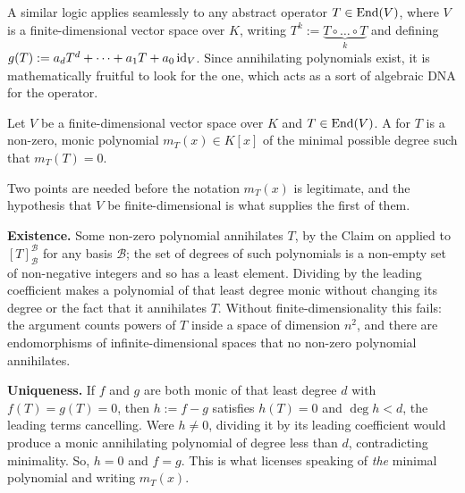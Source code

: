 A similar logic applies seamlessly to any abstract operator $T \in \operatorname{End}(V)$, where $V$ is a finite-dimensional vector space over $K$, writing $T^k := \underbrace{T \circ \dots \circ T}_{k}$ and defining $g(T) := a_d T^d + \dots + a_1 T + a_0 \operatorname{id}_V$. Since annihilating polynomials exist, it is mathematically fruitful to look for the  one, which acts as a sort of algebraic DNA for the operator.

\begin{definition}
  \label{def:minimal_poly}
  Let $V$ be a finite-di\-men\-sional vector space over $K$ and $T \in \operatorname{End}(V)$. A  for $T$ is a non-zero, monic polynomial $m_T(x) \in K[x]$ of the minimal possible degree such that $m_T(T) = 0$.
\end{definition}

\begin{remark}
\label{rem:minimal_poly_well_defined}
Two points are needed before the notation $m_T(x)$ is legitimate, and the hypothesis that $V$ be finite-di\-men\-sional is what supplies the first of them.

\textbf{Existence.} Some non-zero polynomial annihilates $T$, by the Claim on  applied to $[T]_{\mathcal{B}}^{\mathcal{B}}$ for any basis $\mathcal{B}$; the set of degrees of such polynomials is a non-empty set of non-negative integers and so has a least element. Dividing by the leading coefficient makes a polynomial of that least degree monic without changing its degree or the fact that it annihilates $T$. Without finite-di\-men\-sionality this fails: the argument counts powers of $T$ inside a space of dimension $n^2$, and there are endomorphisms of infinite-di\-men\-sional spaces that no non-zero polynomial annihilates.

\textbf{Uniqueness.} If $f$ and $g$ are both monic of that least degree $d$ with $f(T) = g(T) = 0$, then $h := f - g$ satisfies $h(T) = 0$ and $\deg h < d$, the leading terms cancelling. Were $h \ne 0$, dividing it by its leading coefficient would produce a monic annihilating polynomial of degree less than $d$, contradicting minimality. So, $h = 0$ and $f = g$. This is what licenses speaking of \emph{the} minimal polynomial and writing $m_T(x)$.
\end{remark}

